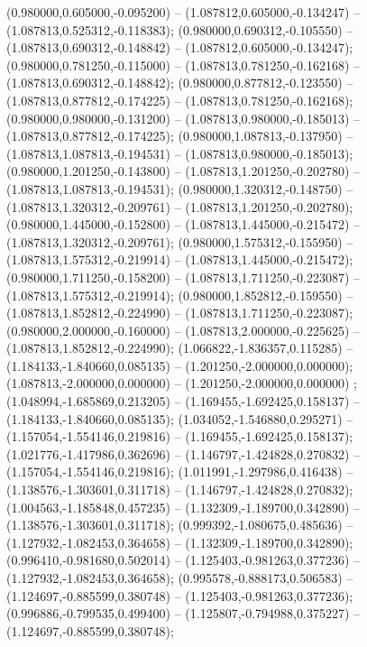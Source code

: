  (0.980000,0.605000,-0.095200) -- (1.087812,0.605000,-0.134247) -- (1.087813,0.525312,-0.118383);
 (0.980000,0.690312,-0.105550) -- (1.087813,0.690312,-0.148842) -- (1.087812,0.605000,-0.134247);
 (0.980000,0.781250,-0.115000) -- (1.087813,0.781250,-0.162168) -- (1.087813,0.690312,-0.148842);
 (0.980000,0.877812,-0.123550) -- (1.087813,0.877812,-0.174225) -- (1.087813,0.781250,-0.162168);
 (0.980000,0.980000,-0.131200) -- (1.087813,0.980000,-0.185013) -- (1.087813,0.877812,-0.174225);
 (0.980000,1.087813,-0.137950) -- (1.087813,1.087813,-0.194531) -- (1.087813,0.980000,-0.185013);
 (0.980000,1.201250,-0.143800) -- (1.087813,1.201250,-0.202780) -- (1.087813,1.087813,-0.194531);
 (0.980000,1.320312,-0.148750) -- (1.087813,1.320312,-0.209761) -- (1.087813,1.201250,-0.202780);
 (0.980000,1.445000,-0.152800) -- (1.087813,1.445000,-0.215472) -- (1.087813,1.320312,-0.209761);
 (0.980000,1.575312,-0.155950) -- (1.087813,1.575312,-0.219914) -- (1.087813,1.445000,-0.215472);
 (0.980000,1.711250,-0.158200) -- (1.087813,1.711250,-0.223087) -- (1.087813,1.575312,-0.219914);
 (0.980000,1.852812,-0.159550) -- (1.087813,1.852812,-0.224990) -- (1.087813,1.711250,-0.223087);
 (0.980000,2.000000,-0.160000) -- (1.087813,2.000000,-0.225625) -- (1.087813,1.852812,-0.224990);
 (1.066822,-1.836357,0.115285) -- (1.184133,-1.840660,0.085135) -- (1.201250,-2.000000,0.000000);
 (1.087813,-2.000000,0.000000) -- (1.201250,-2.000000,0.000000) ;
 (1.048994,-1.685869,0.213205) -- (1.169455,-1.692425,0.158137) -- (1.184133,-1.840660,0.085135);
 (1.034052,-1.546880,0.295271) -- (1.157054,-1.554146,0.219816) -- (1.169455,-1.692425,0.158137);
 (1.021776,-1.417986,0.362696) -- (1.146797,-1.424828,0.270832) -- (1.157054,-1.554146,0.219816);
 (1.011991,-1.297986,0.416438) -- (1.138576,-1.303601,0.311718) -- (1.146797,-1.424828,0.270832);
 (1.004563,-1.185848,0.457235) -- (1.132309,-1.189700,0.342890) -- (1.138576,-1.303601,0.311718);
 (0.999392,-1.080675,0.485636) -- (1.127932,-1.082453,0.364658) -- (1.132309,-1.189700,0.342890);
 (0.996410,-0.981680,0.502014) -- (1.125403,-0.981263,0.377236) -- (1.127932,-1.082453,0.364658);
 (0.995578,-0.888173,0.506583) -- (1.124697,-0.885599,0.380748) -- (1.125403,-0.981263,0.377236);
 (0.996886,-0.799535,0.499400) -- (1.125807,-0.794988,0.375227) -- (1.124697,-0.885599,0.380748);
